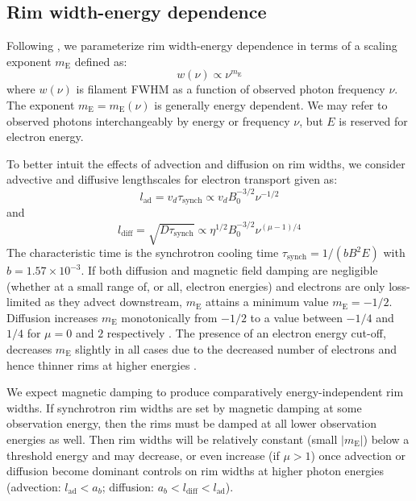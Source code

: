 \documentclass[iop, apj, numberedappendix]{emulateapj}
\newcommand*{\mt}{\mathrm}
\newcommand*{\tsynch}{\tau_{\mt{synch}}}
\newcommand*{\mE}{m_\mt{E}}
\begin{document}
\subsection{Rim width-energy dependence} \label{sec:energydep}

Following , we parameterize rim width-energy dependence
in terms of a scaling exponent $\mE$ defined as:
\begin{equation}
    w(\nu) \propto \nu^{\mE}
\end{equation}
where $w(\nu)$ is filament FWHM as a function of observed photon frequency
$\nu$.  The exponent $\mE = \mE(\nu)$ is generally energy dependent.  We may
refer to observed photons interchangeably by energy or frequency $\nu$, but $E$
is reserved for electron energy.

To better intuit the effects of advection and diffusion on rim widths, we
consider advective and diffusive lengthscales for electron transport given as:
\begin{equation} \label{eq:lad}
    l_{\mt{ad}} = v_d \tsynch \propto v_d B_0^{-3/2} \nu^{-1/2}
\end{equation}
and
\begin{equation} \label{eq:ldiff}
    l_{\mt{diff}} = \sqrt{D \tsynch} \propto \eta^{1/2} B_0^{-3/2} \nu^{(\mu-1)/4}
\end{equation}
The characteristic time is the synchrotron cooling time
$\tsynch = 1 / (b B^2 E)$ with $b = 1.57 \times 10^{-3}$.
If both diffusion and magnetic field damping are negligible (whether at a small
range of, or all, electron energies) and electrons are only loss-limited as
they advect downstream, $\mE$ attains a minimum value $\mE = -1/2$.  Diffusion
increases $\mE$ monotonically from $-1/2$ to a value between $-1/4$ and $1/4$
for $\mu = 0$ and $2$ respectively .  The
presence of an electron energy cut-off, decreases $\mE$ slightly in all cases
due to the decreased number of electrons and hence thinner rims at higher
energies .

We expect magnetic damping to produce comparatively energy-independent rim
widths.  If synchrotron rim widths are set by magnetic damping
at some observation energy, then the rims must be damped at all lower
observation energies as well.  Then rim widths will be relatively constant
(small $|\mE|$) below a threshold energy and may decrease, or even increase
(if $\mu > 1$) once advection or diffusion become dominant controls on rim
widths at higher photon energies (advection: $l_\mt{ad} < a_b$;
diffusion: $a_b < l_{\mt{diff}} < l_{\mt{ad}}$).
\end{document}
